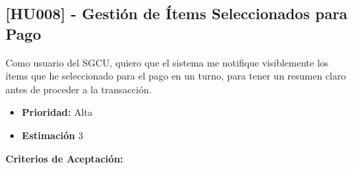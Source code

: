 \documentclass[12pt]{article}
\begin{document}
\pagebreak

\subsection{[HU008] - Gestión de Ítems Seleccionados para Pago}

Como usuario del SGCU, quiero que el sistema me notifique visiblemente los ítems que he seleccionado para el pago en un turno, para tener un resumen claro antes de proceder a la transacción.

\begin{itemize}
	\item \textbf{Prioridad:} Alta
	\item \textbf{Estimación} 3
\end{itemize}

\textbf{Criterios de Aceptación:}
\end{document}
